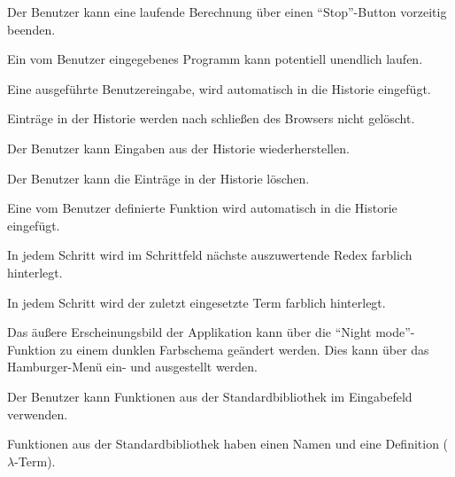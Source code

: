 \documentclass[parskip=full,11pt,twoside]{scrartcl}
\begin{document}
 
Der Benutzer kann eine laufende Berechnung über einen \enquote{Stop}-Button vorzeitig beenden.

Ein vom Benutzer eingegebenes Programm kann potentiell unendlich laufen.

Eine ausgeführte Benutzereingabe, wird automatisch in die Historie eingefügt.

Einträge in der Historie werden nach schließen des Browsers nicht gelöscht.

Der Benutzer kann Eingaben aus der Historie wiederherstellen.

Der Benutzer kann die Einträge in der Historie löschen.

Eine vom Benutzer definierte Funktion wird automatisch in die Historie eingefügt.

In jedem Schritt wird im Schrittfeld nächste auszuwertende Redex farblich hinterlegt.

In jedem Schritt wird der zuletzt eingesetzte Term farblich hinterlegt.

Das äußere Erscheinungsbild der Applikation kann über die \enquote{Night mode}-Funktion zu einem dunklen Farbschema geändert werden. Dies kann über das Hamburger-Menü ein- und ausgestellt werden.

Der Benutzer kann Funktionen aus der Standardbibliothek im Eingabefeld verwenden.

Funktionen aus der Standardbibliothek haben einen Namen und eine Definition ($\lambda$-Term).
\end{document}
